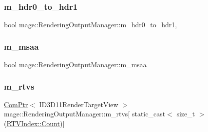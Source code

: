 \hypertarget{classmage_1_1_rendering_output_manager_ae2164d5657239162591cdcdefa75e240}{}\label{classmage_1_1_rendering_output_manager_ae2164d5657239162591cdcdefa75e240} 
\subsubsection{\texorpdfstring{m\+\_\+hdr0\+\_\+to\+\_\+hdr1}{m\_hdr0\_to\_hdr1}}
{\footnotesize\ttfamily bool mage\+::\+Rendering\+Output\+Manager\+::m\+\_\+hdr0\+\_\+to\+\_\+hdr1\hspace{0.3cm}{\ttfamily [mutable]}, {\ttfamily [private]}}

\hypertarget{classmage_1_1_rendering_output_manager_ab28e6451a0c2eb918b63ae312018ffe1}{}\label{classmage_1_1_rendering_output_manager_ab28e6451a0c2eb918b63ae312018ffe1} 
\subsubsection{\texorpdfstring{m\+\_\+msaa}{m\_msaa}}
{\footnotesize\ttfamily bool mage\+::\+Rendering\+Output\+Manager\+::m\+\_\+msaa\hspace{0.3cm}{\ttfamily [private]}}

\hypertarget{classmage_1_1_rendering_output_manager_a319f9b33395053ea23be97768410942c}{}\label{classmage_1_1_rendering_output_manager_a319f9b33395053ea23be97768410942c} 
\subsubsection{\texorpdfstring{m\+\_\+rtvs}{m\_rtvs}}
{\footnotesize\ttfamily \hyperlink{namespacemage_ae74f374780900893caa5555d1031fd79}{Com\+Ptr}$<$ I\+D3\+D11\+Render\+Target\+View $>$ mage\+::\+Rendering\+Output\+Manager\+::m\+\_\+rtvs\mbox{[} static\+\_\+cast$<$ size\+\_\+t $>$(\hyperlink{classmage_1_1_rendering_output_manager_aebe136819797593f0fcf53b753e9c3ceae93f994f01c537c4e2f7d8528c3eb5e9}{R\+T\+V\+Index\+::\+Count})\mbox{]}\hspace{0.3cm}{\ttfamily [private]}}


